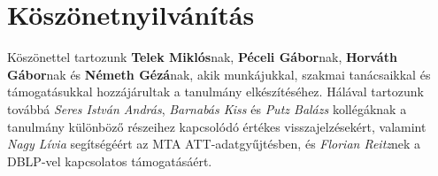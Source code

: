 \documentclass[12pt,a4paper]{article}
\begin{document}



\section{Köszönetnyilvánítás}

Köszönettel tartozunk \textbf{Telek Miklós}nak,  \textbf{Péceli Gábor}nak, \textbf{Horváth Gábor}nak és \textbf{Németh Gézá}nak, akik munkájukkal, szakmai tanácsaikkal és támogatásukkal hozzájárultak a tanulmány elkészítéséhez. Hálával tartozunk továbbá \textit{Seres István András}, \textit{Barnabás Kiss} és \textit{Putz Balázs} kollégáknak a tanulmány különböző részeihez kapcsolódó értékes visszajelzésekért, valamint \textit{Nagy Lívia} segítségéért az MTA ATT-adatgyűjtésben, és \textit{Florian Reitz}nek a DBLP-vel kapcsolatos támogatásáért.
\end{document}
